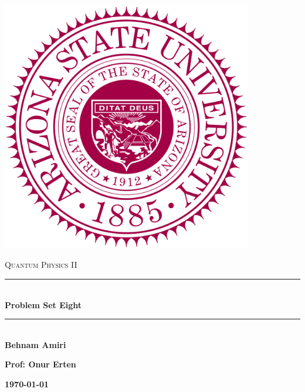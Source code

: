 \documentclass[fleqn]{article}
\begin{document}
  \begin{titlepage}

    \newcommand{\HRule}{\rule{\linewidth}{0.5mm}}

    \center

    \begin{center}
      \includegraphics[height=11cm, width=11cm]{asu.png}
    \end{center}

    \vline

    \textsc{\LARGE Quantum Physics II}\\[1.5cm]

    \HRule \\[0.5cm]
    { \huge \bfseries Problem Set Eight}\\[0.4cm] 
    \HRule \\[1.0cm]

    \textbf{Behnam Amiri}

    \bigbreak

    \textbf{Prof: Onur Erten}

    \bigbreak

    \textbf{{\large \today}\\[2cm]}

    \vfill

  \end{titlepage}
\end{document}
